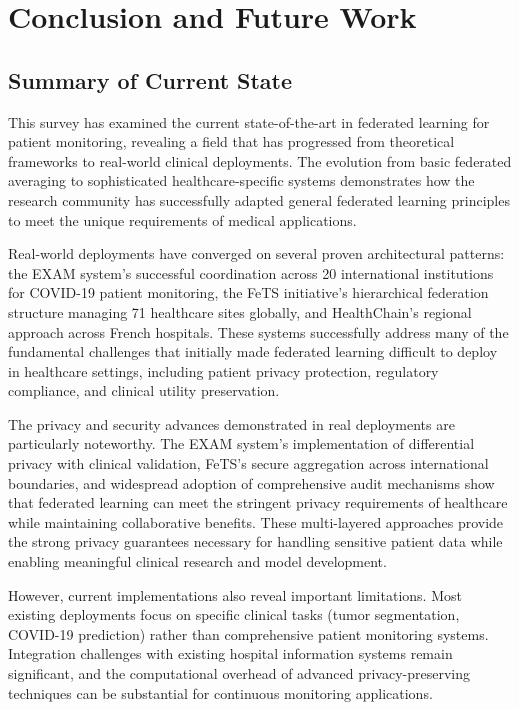\documentclass[3p,times,procedia]{elsarticle}
\begin{document}
\section{Conclusion and Future Work}

\subsection{Summary of Current State}

This survey has examined the current state-of-the-art in federated learning for patient monitoring, revealing a field that has progressed from theoretical frameworks to real-world clinical deployments. The evolution from basic federated averaging to sophisticated healthcare-specific systems demonstrates how the research community has successfully adapted general federated learning principles to meet the unique requirements of medical applications.

Real-world deployments have converged on several proven architectural patterns: the EXAM system's successful coordination across 20 international institutions for COVID-19 patient monitoring, the FeTS initiative's hierarchical federation structure managing 71 healthcare sites globally, and HealthChain's regional approach across French hospitals. These systems successfully address many of the fundamental challenges that initially made federated learning difficult to deploy in healthcare settings, including patient privacy protection, regulatory compliance, and clinical utility preservation.

The privacy and security advances demonstrated in real deployments are particularly noteworthy. The EXAM system's implementation of differential privacy with clinical validation, FeTS's secure aggregation across international boundaries, and widespread adoption of comprehensive audit mechanisms show that federated learning can meet the stringent privacy requirements of healthcare while maintaining collaborative benefits. These multi-layered approaches provide the strong privacy guarantees necessary for handling sensitive patient data while enabling meaningful clinical research and model development.

However, current implementations also reveal important limitations. Most existing deployments focus on specific clinical tasks (tumor segmentation, COVID-19 prediction) rather than comprehensive patient monitoring systems. Integration challenges with existing hospital information systems remain significant, and the computational overhead of advanced privacy-preserving techniques can be substantial for continuous monitoring applications.
\end{document}
